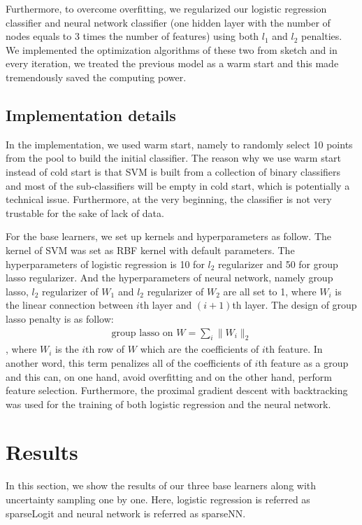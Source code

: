 \documentclass{article}
\begin{document}
Furthermore, to overcome overfitting, we regularized our logistic regression classifier and neural network classifier (one hidden layer with the number of nodes equals to 3 times the number of features) using both $l_1$ and $l_2$ penalties. We implemented the optimization algorithms of these two from sketch and in every iteration, we treated the previous model as a warm start and this made tremendously saved the computing power.

\subsection{Implementation details}


In the implementation, we used warm start, namely to randomly select 10 points from the pool to build the initial classifier. The reason why we use warm start instead of cold start is that SVM is built from a collection of binary classifiers and most of the sub-classifiers will be empty in cold start, which is potentially a technical issue. Furthermore, at the very beginning, the classifier is not very trustable for the sake of lack of data. 


For the base learners, we set up kernels and hyperparameters as follow. The kernel of SVM was set as RBF kernel with default parameters. The hyperparameters of logistic regression is 10 for $l_2$ regularizer and 50 for group lasso regularizer. And the hyperparameters of neural network, namely group lasso, $l_2$ regularizer of $W_1$ and $l_2$ regularizer of $W_2$ are all set to 1, where $W_i$ is the linear connection between $i$th layer and $(i+1)$th layer. The design of group lasso penalty is as follow:
\begin{align*}
  \text{group lasso on } W = \sum_i \|W_i\|_2
\end{align*}
, where $W_i$ is the $i$th row of $W$ which are the coefficients of $i$th feature. In another word, this term penalizes all of the coefficients of $i$th feature as a group and this can, on one hand, avoid overfitting and on the other hand, perform feature selection. Furthermore, the proximal gradient descent with backtracking was used for the training of both logistic regression and the neural network.

\section{Results}

In this section, we show the results of our three base learners along with uncertainty sampling one by one. Here, logistic regression is referred as sparseLogit and neural network is referred as sparseNN.
\end{document}
